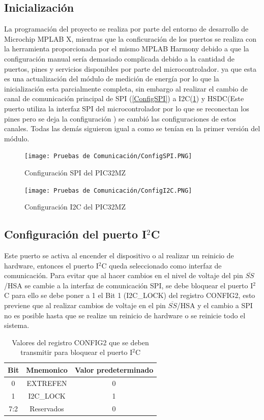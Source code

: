 \documentclass[letterpaper,12pt,oneside]{book}
\begin{document}
			\subsection{Inicialización}
			La programación del proyecto se realiza por parte del entorno de desarrollo de Microchip MPLAB X, mientras que la conficuración de los puertos se realiza con la herramienta proporcionada por el mismo MPLAB Harmony debido a que la configuración manual sería demasiado complicada debido a la cantidad de puertos, pines y servicios disponibles por parte del microcontrolador. ya que esta es una actualización del módulo de medición de energía por lo que la inicialización esta parcialmente completa, sin embargo al realizar el cambio de canal de comunicación principal de SPI (\ref{ConfigSPI}) a I2C(\ref{ConfigI2C}) y HSDC(Este puerto utiliza la interfaz SPI del microcontrolador por lo que se reconectan los pines pero se deja la configuración ) se cambió las configuraciones de estos canales. Todas las demás siguieron igual a como se tenían en la primer versión del módulo.

			\begin{figure}[!htpb]
				\centering
				\texttt{[image: Pruebas de Comunicación/ConfigSPI.PNG]}
				\caption[Configuración SPI del PIC32MZ]{Configuración SPI del PIC32MZ}
				\label{ConfigSPI} 
				\hfill \break
				\texttt{[image: Pruebas de Comunicación/ConfigI2C.PNG]}
				\caption[Configuración I2C del PIC32MZ]{Configuración I2C del PIC32MZ}
				\label{ConfigI2C}
			\end{figure}

			\subsection{Configuración del puerto I$^2$C}
			Este puerto se activa al encender el dispositivo o al realizar un reinicio de hardware, entonces el puerto I$^2$C queda seleccionado como interfaz de comunicación. Para evitar que al hacer cambios en el nivel de voltaje del pin $\overline{SS}$/HSA se cambie a la interfaz de comunicación SPI, se debe bloquear el puerto I$^2$C para ello se debe poner a 1 el Bit 1 (I2C\_LOCK) del registro CONFIG2, esto previene que al realizar cambios de voltaje en el pin $\overline{SS}$/HSA y el cambio a SPI no es posible hasta que se realize un reinicio de hardware o se reinicie todo el sistema.

			\begin{table}[ht]
				\centering
				\begin{tabular}{c | c | c}
					\textbf{Bit} & \textbf{Mnemonico} & \textbf{Valor predeterminado} \\
					\hline
					0 & EXTREFEN & 0 \\
					\hline
					1 & I2C\_LOCK & 1 \\
					\hline
					7:2 & Reservados & 0 \\
				\end{tabular}
				\caption[Valores de bloqueo del puerto I$^2$C]{Valores del registro CONFIG2 que se deben transmitir para bloquear el puerto I$^2$C}
			\end{table}
\end{document}
